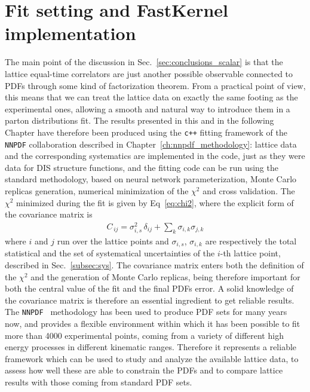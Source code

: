 \section{Fit setting and FastKernel implementation}
\label{sec:fk_qpdf}
The main point of the discussion in Sec.~\ref{sec:conclusions_scalar} is that the lattice equal-time correlators 
are just another possible observable connected to PDFs through some kind of factorization theorem.
From a practical point of view, this means that we can treat the lattice data on
exactly the same footing as the experimental ones, allowing a smooth and natural
way to introduce them in a parton distributions fit. The results presented in this and in the following
Chapter have therefore been produced using the {\tt c++} fitting framework of the {\tt NNPDF} collaboration
described in Chapter~\ref{ch:nnpdf_methodology}: lattice data and the corresponding systematics
are implemented in the code, just as they were data for DIS structure functions, and the fitting code
can be run using the standard methodology, based on neural network parameterization, Monte Carlo replicas generation,
numerical minimization of the $\chi^2$ and cross validation.
The $\chi^2$ minimized during the fit is given by Eq~\eqref{eq:chi2}, where the explicit form of the 
covariance matrix is
\begin{align}
	\label{eq:covariance}
    C_{\,ij} = \sigma_{i,s}^2\, \delta_{ij} + \sum_k \sigma_{i,k} \sigma_{j,k} 
\end{align}
where $i$ and $j$ run over the lattice points and $\sigma_{i,s}$, $\sigma_{i,k}$ 
are respectively the total statistical and the set of  systematical uncertainties
of the $i$-th lattice point, described in Sec.~\ref{subsec:sys}.
The covariance matrix enters both the definition of the $\chi^2$  
and the generation of Monte Carlo replicas,
being therefore important for both the central value of the fit and the final PDFs error. A solid knowledge 
of the covariance matrix is therefore an essential ingredient to get reliable results.
The {\tt NNPDF } methodology has been used to produce PDF sets for many years now, and provides a flexible environment
within which it has been possible to fit more than 4000 experimental points, coming from a variety 
of different high energy processes in different kinematic ranges.
Therefore it represents a reliable framework which can be used to study and analyze the available lattice data, to assess
how well these are able to constrain the PDFs and to compare lattice results with those coming from standard PDF sets.

